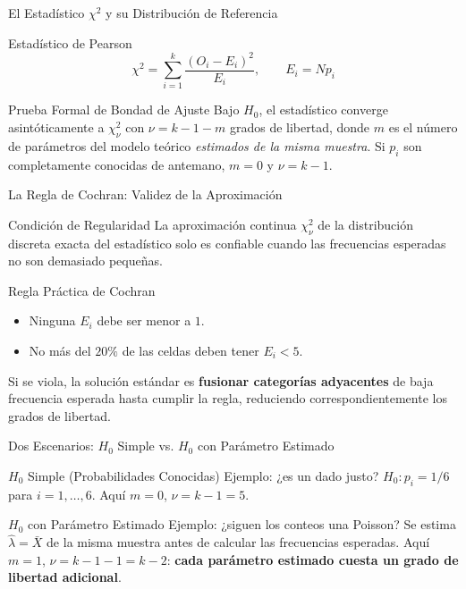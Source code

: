\documentclass[10pt, aspectratio=169]{beamer}
\begin{document}
\begin{frame}{El Estadístico $\chi^2$ y su Distribución de Referencia}
  \footnotesize
  \begin{block}{Estadístico de Pearson}
    $$\chi^2 = \sum_{i=1}^k \frac{(O_i-E_i)^2}{E_i}, \qquad E_i = Np_i$$
  \end{block}
  \pause

  \vspace{0.1cm}
  \begin{alertblock}{Prueba Formal de Bondad de Ajuste}
    Bajo $H_0$, el estadístico converge asintóticamente a $\chi^2_\nu$ con $\nu=k-1-m$ grados de libertad, donde $m$ es el número de parámetros del modelo teórico \emph{estimados de la misma muestra}. Si $p_i$ son completamente conocidas de antemano, $m=0$ y $\nu=k-1$.
  \end{alertblock}
\end{frame}

\begin{frame}{La Regla de Cochran: Validez de la Aproximación}
  \footnotesize
  \begin{block}{Condición de Regularidad}
    La aproximación continua $\chi^2_\nu$ de la distribución discreta exacta del estadístico solo es confiable cuando las frecuencias esperadas no son demasiado pequeñas.
  \end{block}
  \pause

  \vspace{0.1cm}
  \begin{alertblock}{Regla Práctica de Cochran}
    \begin{itemize}\itemsep=0.05cm
      \item Ninguna $E_i$ debe ser menor a $1$.
      \item No más del $20\%$ de las celdas deben tener $E_i<5$.
    \end{itemize}
    Si se viola, la solución estándar es \textbf{fusionar categorías adyacentes} de baja frecuencia esperada hasta cumplir la regla, reduciendo correspondientemente los grados de libertad.
  \end{alertblock}
\end{frame}

\begin{frame}{Dos Escenarios: $H_0$ Simple vs. $H_0$ con Parámetro Estimado}
  \footnotesize
  \begin{block}{$H_0$ Simple (Probabilidades Conocidas)}
    Ejemplo: ¿es un dado justo? $H_0: p_i=1/6$ para $i=1,\ldots,6$. Aquí $m=0$, $\nu=k-1=5$.
  \end{block}
  \pause

  \vspace{0.1cm}
  \begin{alertblock}{$H_0$ con Parámetro Estimado}
    Ejemplo: ¿siguen los conteos una Poisson? Se estima $\hat\lambda=\bar X$ de la misma muestra antes de calcular las frecuencias esperadas. Aquí $m=1$, $\nu=k-1-1=k-2$: \textbf{cada parámetro estimado cuesta un grado de libertad adicional}.
  \end{alertblock}
\end{frame}
\end{document}
